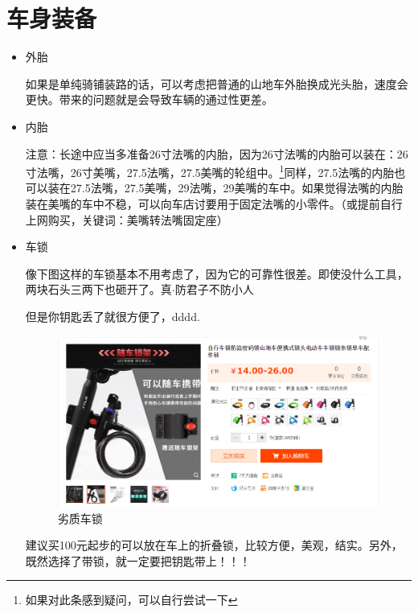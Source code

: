 \documentclass{ctexbook}
\begin{document}
\section{车身装备} 
    \begin{itemize}
        \item 外胎
        
        如果是单纯骑铺装路的话，可以考虑把普通的山地车外胎换成光头胎，速度会更快。带来的问题就是会导致车辆的通过性更差。

        \item 内胎
        
        注意：长途中应当多准备26寸法嘴的内胎，因为26寸法嘴的内胎可以装在：26寸法嘴，26寸美嘴，27.5法嘴，27.5美嘴的轮组中。\footnote{如果对此条感到疑问，可以自行尝试一下}同样，27.5法嘴的内胎也可以装在27.5法嘴，27.5美嘴，29法嘴，29美嘴的车中。如果觉得法嘴的内胎装在美嘴的车中不稳，可以向车店讨要用于固定法嘴的小零件。（或提前自行上网购买，关键词：美嘴转法嘴固定座）
        
        \item 车锁
        
        像下图这样的车锁基本不用考虑了，因为它的可靠性很差。即使没什么工具，两块石头三两下也砸开了。真$\cdot$防君子不防小人

        但是你钥匙丢了就很方便了，dddd.

        \begin{figure}[H]
            \begin{center}
            \includegraphics[scale=0.3]{fig/劣质车锁.png}
            \caption{劣质车锁}
            \end{center}            
        \end{figure}

        建议买100元起步的可以放在车上的折叠锁，比较方便，美观，结实。另外，既然选择了带锁，就一定要把钥匙带上！！！


\end{itemize}
\end{document}
